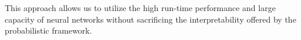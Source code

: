 \documentclass[12pt]{article}
\begin{document}
This approach allows us to utilize the high run-time performance and large capacity of neural networks 
without sacrificing the interpretability offered by the probabilistic framework.
 


% 
% 
% 
% 
% 





% 
% 
\end{document}

